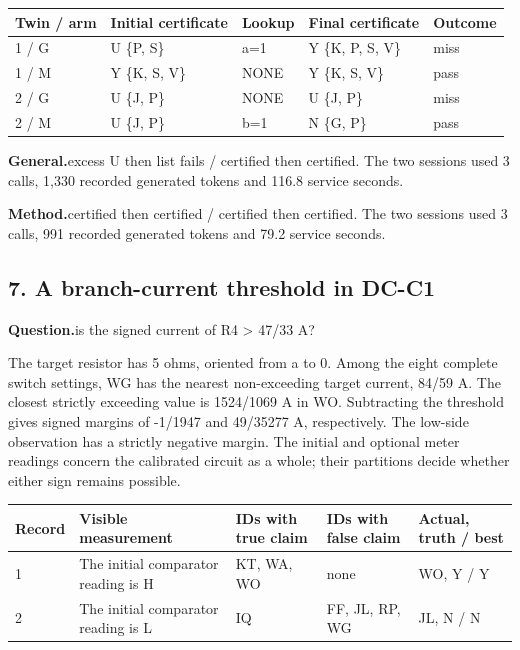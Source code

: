 \documentclass[12pt,letterpaper]{article}
\newcommand{\dossier}[2]{\clearpage\subsection*{#1}\phantomsection\label{#2}}
\newcommand{\reading}[2]{\par\smallskip\textsf{\color{accent}\bfseries #1}\enspace #2\par}
\begin{document}
\begin{center}\footnotesize\setlength{\tabcolsep}{4pt}\begin{tabularx}{\linewidth}{lYlYl}\toprule
Twin / arm & Initial certificate & Lookup & Final certificate & Outcome\\ / G & U \{P, S\} & a=1 & Y \{K, P, S, V\} & miss\\
1 / M & Y \{K, S, V\} & NONE & Y \{K, S, V\} & pass\\
2 / G & U \{J, P\} & NONE & U \{J, P\} & miss\\
2 / M & U \{J, P\} & b=1 & N \{G, P\} & pass\\
\bottomrule\end{tabularx}\end{center}


\reading{General.}{excess U then list fails / certified then certified. The two sessions used 3 calls, 1,330 recorded generated tokens and 116.8 service seconds.}

\reading{Method.}{certified then certified / certified then certified. The two sessions used 3 calls, 991 recorded generated tokens and 79.2 service seconds.}

\dossier{7. A branch-current threshold in DC-C1}{case7}

\reading{Question.}{is the signed current of R4 \textgreater{} 47/33 A?}

The target resistor has 5 ohms, oriented from a to 0. Among the eight complete switch settings, WG has the nearest non-exceeding target current, 84/59 A. The closest strictly exceeding value is 1524/1069 A in WO. Subtracting the threshold gives signed margins of -1/1947 and 49/35277 A, respectively. The low-side observation has a strictly negative margin. The initial and optional meter readings concern the calibrated circuit as a whole; their partitions decide whether either sign remains possible.

\begin{center}\footnotesize\setlength{\tabcolsep}{4pt}\begin{tabularx}{\linewidth}{lYYYl}\toprule
Record & Visible measurement & IDs with true claim & IDs with false claim & Actual, truth / best\\ & The initial comparator reading is H & KT, WA, WO & none & WO, Y / Y\\
2 & The initial comparator reading is L & IQ & FF, JL, RP, WG & JL, N / N\\
\bottomrule\end{tabularx}\end{center}
\end{document}
